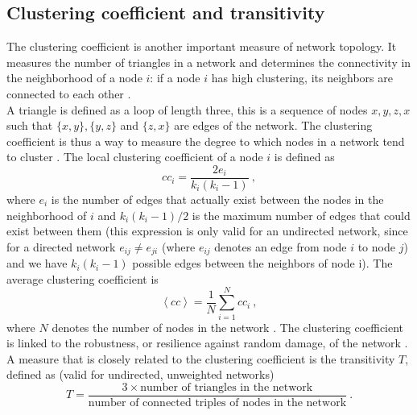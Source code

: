 \documentclass[11 pt , letterpaper , twoside , openright]{book}
\begin{document}
\subsection{Clustering coefficient and transitivity}

The clustering coefficient is another important measure of network topology. It measures the number of triangles in a network and determines the connectivity in the neighborhood of a node $i$: if a node $i$ has high clustering, its neighbors are connected to each other \cite{Li2017}. \\
\newline
A triangle is defined as a loop of length three, this is a sequence of nodes $x, y, z, x$ such that $\{x, y\}, \{y, z\}$ and $\{z, x\}$ are edges of the network. The clustering coefficient is thus a way to measure the degree to which nodes in a network tend to cluster \cite{Li2017}. The local clustering coefficient of a node $i$ is defined as 
\begin{equation}\label{clus}
	cc_i = \frac{2e_i}{k_i(k_i-1)} \ ,
\end{equation}
where $e_i$ is the number of edges that actually exist between the nodes in the neighborhood of $i$ and $k_i(k_i-1)/2$ is the maximum number of edges that could exist between them \cite{Mata2020} (this expression is only valid for an undirected network, since for a directed network $e_{ij} \neq e_{ji}$ (where $e_{ij}$ denotes an edge from node $i$ to node $j$) and we have $k_i(k_i-1)$ possible edges between the neighbors of node i). %
The average clustering coefficient is 
\begin{equation}\label{avClus}
	\left<cc\right> = \frac{1}{N}\sum_{i = 1}^N cc_i \ ,
\end{equation}
where $N$ denotes the number of nodes in the network \cite{Newman2003}. The clustering coefficient is linked to the robustness, or resilience against random damage, of the network \cite{Heer2020}\cite{Iyer2013}\cite{Li2017}. \\
\newline
A measure that is closely related to the clustering coefficient is the transitivity $T$, defined as (valid for undirected, unweighted networks) \cite{F.Costa2007}\cite{Newman2003}
\begin{equation}\label{globalTrans}
	T = \frac{3 \times \text{number of triangles in the network}}{\text{number of connected triples of nodes in the network}} \ .
\end{equation}
\end{document}
